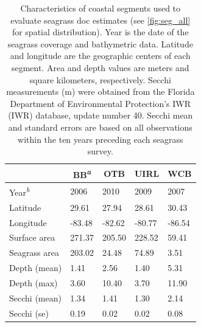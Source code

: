 \documentclass[letterpaper,12pt,oneside]{article}\usepackage[]{graphicx}\usepackage[]{color}
\begin{document}



\clearpage
\begin{singlespace}


\end{singlespace}
\clearpage


\begin{table}[!tbp]
\caption{Characteristics of coastal segments used to evaluate seagrass \acl{doc} estimates (see \cref{fig:seg_all} for spatial distribution).  Year is the date of the seagrass coverage and bathymetric data.  Latitude and longitude are the geographic centers of each segment.  Area and depth values are meters and square kilometers, respectively.  Secchi measurements (m) were obtained from the Florida Department of Environmental Protection's \acl{IWR} (\acs{IWR}) database, update number 40.  Secchi mean and standard errors are based on all observations within the ten years preceding each seagrass survey.\label{tab:seg_summ}} 
\begin{center}
\begin{tabular}{lllll}
\hline\hline
\multicolumn{1}{l}{}&\multicolumn{1}{c}{BB\textsuperscript{\textit{a}}}&\multicolumn{1}{c}{OTB}&\multicolumn{1}{c}{UIRL}&\multicolumn{1}{c}{WCB}\tabularnewline
\hline
Year\textsuperscript{\textit{b}}&2006&2010&2009&2007\tabularnewline
Latitude& 29.61& 27.94& 28.61& 30.43\tabularnewline
Longitude&-83.48&-82.62&-80.77&-86.54\tabularnewline
Surface area&271.37&205.50&228.52& 59.41\tabularnewline
Seagrass area&203.02& 24.48& 74.89&  3.51\tabularnewline
Depth (mean)&  1.41&  2.56&  1.40&  5.31\tabularnewline
Depth (max)&  3.60& 10.40&  3.70& 11.90\tabularnewline
Secchi (mean)&  1.34&  1.41&  1.30&  2.14\tabularnewline
Secchi (se)&  0.19&  0.02&  0.02&  0.08\tabularnewline
\hline
\end{tabular}\end{center}


\end{table}
\end{document}
